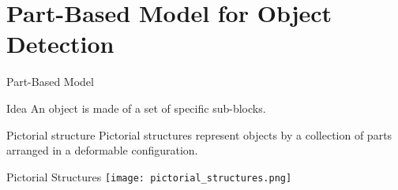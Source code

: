 \begin{frame}[plain]
\end{frame}

\section{Part-Based Model for Object Detection}

\begin{frame}{Part-Based Model}
  \begin{block}{Idea}
    An object is made of a set of specific sub-blocks.
  \end{block}
  \pause
  \begin{block}{Pictorial structure}
    Pictorial structures represent objects by a collection of parts arranged in
    a deformable configuration.
  \end{block}
\end{frame}


\begin{frame}{Pictorial Structures}
  \centering
  \texttt{[image: pictorial\_structures.png]}
\end{frame}
